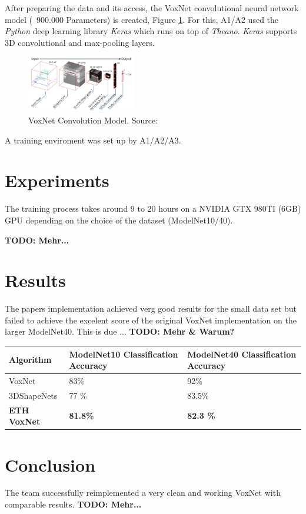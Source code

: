 \documentclass[10pt,twocolumn,letterpaper]{article}
\begin{document}
After preparing the data and its access, the VoxNet convolutional neural network model (~900.000 Parameters) is created, Figure \ref{fig:model}. For this, A1/A2 used the \textit{Python} deep learning library \textit{Keras} which runs on top of \textit{Theano}. \textit{Keras} supports 3D convolutional and max-pooling layers. 

\begin{figure}[h]
	\label{fig:model}
	\centering
	\includegraphics[width=0.42\textwidth]{model}
	\caption{VoxNet Convolution Model. Source: \cite{mature}}
\end{figure}

A training enviroment was set up by A1/A2/A3.

\section{Experiments}

The training process takes around 9 to 20 hours on a NVIDIA GTX 980TI (6GB) GPU depending on the choice of the dataset (ModelNet10/40).

\textbf{TODO: Mehr...}

\section{Results}

The papers implementation achieved verg good results for the small data set but failed to achieve the excelent score of the 
original VoxNet implementation on the larger ModelNet40. 
This is due ... \textbf{TODO: Mehr \& Warum?} \\ 

\begin{tabular}{ |p{2.5cm}||p{2.5cm}|p{2.5cm}|  }
 \hline
 Algorithm & ModelNet10 Classification Accuracy  & ModelNet40 Classification Accuracy \\
 \hline
 VoxNet \cite{maturana_iros_2015}   & 83\% & 92\% \\
 3DShapeNets  \cite{shape}   & 77 \% & 83.5\% \\
\textbf{ETH VoxNet}    & \textbf{81.8\%}   & \textbf{82.3 \%}  \\
 \hline
\end{tabular}

\section{Conclusion}

The team successfully reimplemented a very clean and working VoxNet with comparable results.
\textbf{TODO: Mehr...}

{\small


}
\end{document}
